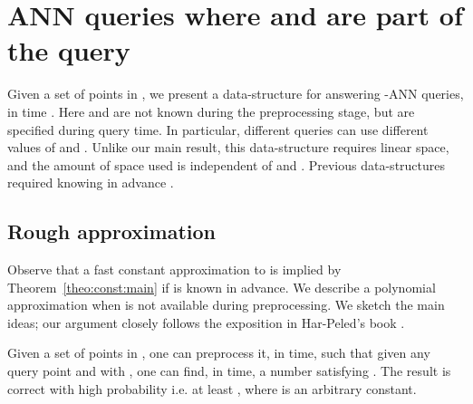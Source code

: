 \documentclass[12pt]{article}
\makeatletter
\providecommand{\lemlab}[1]{\label{lemma:#1}}
\newcommand{\Term}[1]{\textsf{#1}}
\newcommand{\TermI}[1]{\Term{#1}\index{#1@\Term{#1}}}
\theoremstyle{remark}{\theorembodyfont{\rm} \newtheorem{remark}[theorem]{Remark}}
\newcommand{\thmref}[1]{Theorem~\ref{theo:#1}}
\newcommand{\seclab}[1]{{\label{section:#1}}}
\newcommand{\ANN}{\TermI{ANN}\xspace}
\makeatother
\begin{document}
\section{\ANN queries where  and  are part of the query}
\seclab{qtree:algo}

Given a set  of  points in , we present a
data-structure for answering -\ANN queries, 
in time . Here  and  are not known
during the preprocessing stage, but are specified during query
time. In particular, different queries
can use different values of  and . Unlike our main result,
this data-structure requires linear space, and the amount of space used 
is independent of 
and . Previous data-structures required knowing  in
advance \cite{amm-sttas-05}.


\subsection{Rough approximation}


Observe that a fast constant approximation to
 is implied by \thmref{const:main} if 
is known in advance.  We describe a polynomial approximation when 
is not available during preprocessing.  We sketch the main ideas; our
argument closely follows the exposition in {Har-Peled}'s book
\cite{h-gaa-11}.

\begin{lemma}\lemlab{polyapprox}Given a set  of  points in , one can preprocess
    it, in  time, such that given any query point
     and  with , one can find, in  time, 
    a number 
    satisfying . The result
    is correct with high probability i.e. at least , 
    where  is an arbitrary constant.
\end{lemma}
\end{document}

